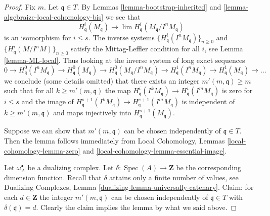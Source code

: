 \documentclass{stacks-project}
\theoremstyle{plain}
\theoremstyle{definition}
\theoremstyle{remark}
\numberwithin{equation}{subsection}
\def\lim{\mathop{\mathrm{lim}}\nolimits}
\def\Spec{\mathop{\mathrm{Spec}}}
\begin{document}
\begin{proof}
Fix $m$. Let $\mathfrak q \in T$.
By Lemmas \ref{lemma-bootstrap-inherited} and
\ref{lemma-algebraize-local-cohomology-bis}
we see that
$$
H^i_\mathfrak q(M_\mathfrak q)
\longrightarrow
\lim H^i_\mathfrak q(M_\mathfrak q/I^nM_\mathfrak q)
$$
is an isomorphism for $i \leq s$. The inverse systems
$\{H^i_\mathfrak q(I^nM_\mathfrak q)\}_{n \geq 0}$ and
$\{H^i_\mathfrak q(M/I^nM)\}_{n \geq 0}$
satisfy the Mittag-Leffler condition for all $i$, see
Lemma \ref{lemma-ML-local}. Thus looking at the inverse system of
long exact sequences
$$
0 \to H^0_\mathfrak q(I^nM_\mathfrak q) \to
H^0_\mathfrak q(M_\mathfrak q) \to
H^0_\mathfrak q(M_\mathfrak q/I^nM_\mathfrak q) \to
H^1_\mathfrak q(I^nM_\mathfrak q) \to
H^1_\mathfrak q(M_\mathfrak q) \to \ldots
$$
we conclude (some details omitted) that there exists an integer
$m'(m, \mathfrak q) \geq m$ such that for all $k \geq m'(m, \mathfrak q)$
the map
$H^i_\mathfrak q(I^kM_\mathfrak q) \to H^i_\mathfrak q(I^mM_\mathfrak q)$
is zero for $i \leq s$ and the image of
$H^{s + 1}_\mathfrak q(I^kM_\mathfrak q) \to
H^{s + 1}_\mathfrak q(I^mM_\mathfrak q)$
is independent of $k \geq m'(m, \mathfrak q)$ and
maps injectively into $H^{s + 1}_\mathfrak q(M_\mathfrak q)$.

\medskip\noindent
Suppose we can show that $m'(m, \mathfrak q)$ can be chosen
independently of $\mathfrak q \in T$.
Then the lemma follows immediately from
Local Cohomology, Lemmas \ref{local-cohomology-lemma-zero} and
\ref{local-cohomology-lemma-essential-image}.

\medskip\noindent
Let $\omega_A^\bullet$ be a dualizing complex. Let
$\delta : \Spec(A) \to \mathbf{Z}$ be the corresponding
dimension function. Recall that $\delta$ attains only a
finite number of values, see
Dualizing Complexes, Lemma \ref{dualizing-lemma-universally-catenary}.
Claim: for each $d \in \mathbf{Z}$ the integer
$m'(m, \mathfrak q)$ can be chosen independently
of $\mathfrak q \in T$ with $\delta(\mathfrak q) = d$.
Clearly the claim implies the lemma by what we said above.


\end{proof}
\end{document}
